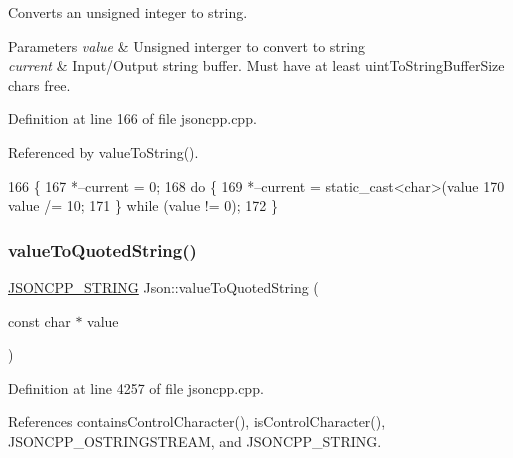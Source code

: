 Converts an unsigned integer to string. 
\begin{DoxyParams}{Parameters}
{\em value} & Unsigned interger to convert to string \\
\hline
{\em current} & Input/\+Output string buffer. Must have at least uint\+To\+String\+Buffer\+Size chars free. \\
\hline
\end{DoxyParams}


Definition at line 166 of file jsoncpp.\+cpp.



Referenced by value\+To\+String().


\begin{DoxyCode}
166                                                                    \{
167   *--current = 0;
168   \textcolor{keywordflow}{do} \{
169     *--current = \textcolor{keyword}{static\_cast<}\textcolor{keywordtype}{char}\textcolor{keyword}{>}(value %
170     value /= 10;
171   \} \textcolor{keywordflow}{while} (value != 0);
172 \}
\end{DoxyCode}
\mbox{\label{namespace_json_aaf777a6923bcb4cf63a2729973fe5315}} 
\subsubsection{\texorpdfstring{value\+To\+Quoted\+String()}{valueToQuotedString()}}
{\footnotesize\ttfamily \hyperlink{json_8h_a1e723f95759de062585bc4a8fd3fa4be}{J\+S\+O\+N\+C\+P\+P\+\_\+\+S\+T\+R\+I\+NG} Json\+::value\+To\+Quoted\+String (\begin{DoxyParamCaption}\item[{const char $\ast$}]{value }\end{DoxyParamCaption})}



Definition at line 4257 of file jsoncpp.\+cpp.



References contains\+Control\+Character(), is\+Control\+Character(), J\+S\+O\+N\+C\+P\+P\+\_\+\+O\+S\+T\+R\+I\+N\+G\+S\+T\+R\+E\+AM, and J\+S\+O\+N\+C\+P\+P\+\_\+\+S\+T\+R\+I\+NG.



